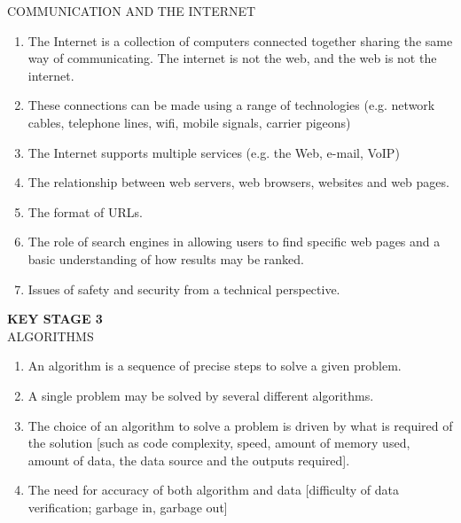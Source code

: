 COMMUNICATION AND THE INTERNET
\begin{enumerate}
\item The Internet is a collection of computers connected together sharing the same way
of communicating. The internet is not the web, and the web is not the internet.
\item These connections can be made using a range of technologies (e.g. network cables,
telephone lines, wifi, mobile signals, carrier pigeons)
\item The Internet supports multiple services (e.g. the Web, e-mail, VoIP)
\item The relationship between web servers, web browsers, websites and web pages.
\item The format of URLs.
\item The role of search engines in allowing users to find specific web pages and a basic
understanding of how results may be ranked.
\item Issues of safety and security from a technical perspective.
\end{enumerate}

\textbf{KEY STAGE 3}\\
ALGORITHMS
\begin{enumerate}
\item An algorithm is a sequence of precise steps to solve a given problem.
\item A single problem may be solved by several different algorithms.
\item The choice of an algorithm to solve a problem is driven by what is required of the
solution [such as code complexity, speed, amount of memory used, amount of data,
the data source and the outputs required].
\item The need for accuracy of both algorithm and data [difficulty of data verification;
garbage in, garbage out]
\end{enumerate}

